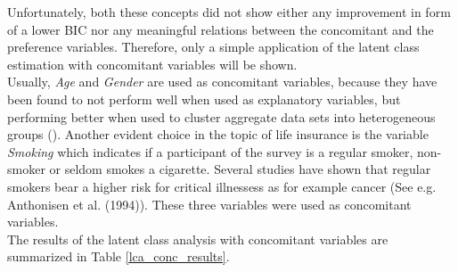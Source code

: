 \documentclass[12pt, abstracton]{article}
\begin{document}
Unfortunately, both these concepts did not show either any improvement in form of a lower BIC nor any meaningful relations between the concomitant and the preference variables. Therefore, only a simple application of the latent class estimation with concomitant variables will be shown.\\
Usually, \textit{Age} and \textit{Gender} are used as concomitant variables, because they have been found to not perform well when used as explanatory variables, but performing better when used to cluster aggregate data sets into heterogeneous groups (\cite{Gruen2008}). Another evident choice in the topic of life insurance is the variable \textit{Smoking} which indicates if a participant of the survey is a regular smoker, non-smoker or seldom smokes a cigarette. Several studies have shown that regular smokers bear a higher risk for critical illnessess as for example cancer (See e.g. Anthonisen et al. (1994)). These three variables were used as concomitant variables.\\
The results of the latent class analysis with concomitant variables are summarized in Table \ref{lca_conc_results}.\\
\setlength\LTleft{0pt}
\setlength\LTright{0pt}
\end{document}

